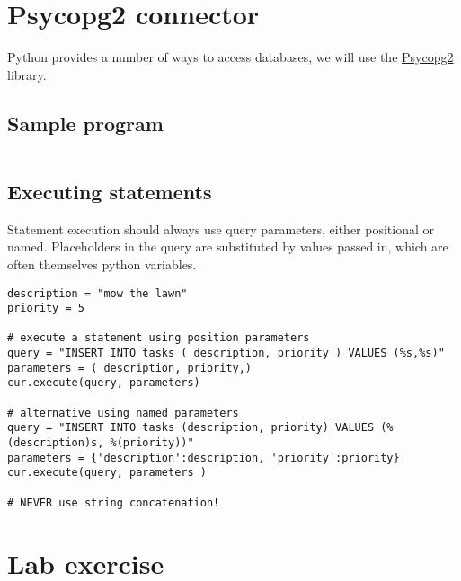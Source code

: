 \documentclass{pgnotes}
\begin{document}
\section{Psycopg2 connector}
\label{sec:psycopg2-connector}

Python provides a number of ways to access databases, we will use the
\href{https://www.psycopg.org}{Psycopg2} library.

\subsection{Sample program}

\inputminted{python}{connectivity_example.py}

\subsection{Executing statements}
\label{sec:executing-statements}

Statement execution should always use query parameters, either positional or named.
Placeholders in the query are substituted by values passed in, which are often themselves python variables.

\begin{verbatim}
description = "mow the lawn"
priority = 5

# execute a statement using position parameters
query = "INSERT INTO tasks ( description, priority ) VALUES (%s,%s)"
parameters = ( description, priority,) 
cur.execute(query, parameters)

# alternative using named parameters
query = "INSERT INTO tasks (description, priority) VALUES (%(description)s, %(priority))"
parameters = {'description':description, 'priority':priority}
cur.execute(query, parameters )

# NEVER use string concatenation!
\end{verbatim}


\section{Lab exercise}
\end{document}
